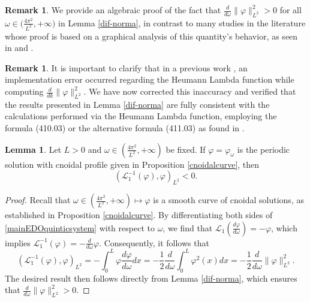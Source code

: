 \documentclass[10pt,reqno,a4paper]{amsart} %
\theoremstyle{definition} %
\numberwithin{equation}{section}
\numberwithin{figure}{section}
\newtheorem{remark}[theorem]{Remark}
\newtheorem{lemma}[theorem]{Lemma}
\begin{document}
\begin{remark}\label{rem:correction0}
    We provide an algebraic proof of the fact that $\frac{d}{d\omega} \|\varphi\|_{L^2}^2 > 0$ for all $\omega \in \big( \tfrac{4\pi^2}{L^2}, +\infty \big)$ in Lemma \ref{dif-norma}, in contrast to many studies in the literature whose proof is based on a graphical analysis of this quantity's behavior, as seen in \cite[Section 6.1]{BittencourtLoreno2022} and  \cite[Subsection 4.3]{NataliCardosoAmaral}. 
\end{remark}

\begin{remark}\label{rem:correction}
    It is important to clarify that in a previous work \cite[Subsection 6.1]{BittencourtLoreno2022}, an implementation error occurred regarding the Heumann Lambda function while computing $\frac{d}{dk} \|\varphi\|_{L^2}^2$. We have now corrected this inaccuracy and verified that the results presented in Lemma \ref{dif-norma} are fully consistent with the calculations performed via the Heumann Lambda function, employing the formula (410.03) or the alternative formula (411.03) as found in \cite[pages 225-226]{byrd}.
\end{remark}

\begin{lemma}\label{L1-cnoidal}
Let $L>0$ and $\omega \in \left( \frac{4\pi^2}{L^2}, +\infty\right)$ be fixed. If  $\varphi=\varphi_\omega$ is the periodic solution with cnoidal profile given in Proposition \ref{cnoidalcurve}, then 
\begin{equation}
    \left( \mathcal{L}_1^{-1}(\varphi), \varphi \right)_{L^2} < 0.
\end{equation}
\end{lemma}

\begin{proof}
    Recall that $\omega \in \left( \frac{4\pi^2}{L^2}, +\infty\right) \longmapsto \varphi$ is a smooth curve of cnoidal solutions, as established in Proposition \ref{cnoidalcurve}. By differentiating both sides of \eqref{mainEDOquinticsystem} with respect to $\omega$, we find that $\mathcal{L}_1\left(\frac{d\varphi}{d\omega}\right) = -\varphi$, which implies $\mathcal{L}_1^{-1}(\varphi) = -\frac{d}{d\omega}\varphi$. Consequently, it follows that
    \begin{equation}\label{inverseL1dnoidalGeneral}
        (\mathcal{L}_1^{-1}(\varphi), \varphi)_{L^2} = - \int_0^L \varphi \frac{d\varphi}{d\omega} dx = - \frac{1}{2}\frac{d}{d\omega} \int_0^L \varphi^2(x) dx = -\frac{1}{2}\frac{d}{d\omega}\|\varphi\|_{L^2}^2.
    \end{equation}
    The desired result then follows directly from Lemma \ref{dif-norma}, which ensures that $\frac{d}{d\omega}\|\varphi\|_{L^2}^2>0$.
\end{proof}
\end{document}
